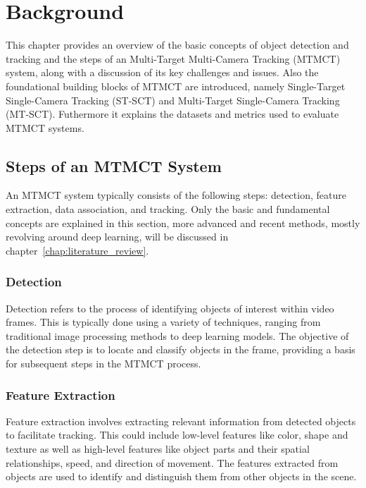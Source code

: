 \chapter{Background}\label{chap:background}
This chapter provides an overview of the basic concepts of object detection and tracking and the steps of an Multi-Target Multi-Camera Tracking (MTMCT) system, along with a discussion of its key challenges and issues. Also the foundational building blocks of MTMCT are introduced, namely Single-Target Single-Camera Tracking (ST-SCT) and Multi-Target Single-Camera Tracking (MT-SCT). Futhermore it explains the datasets and metrics used to evaluate MTMCT systems.

\section{Steps of an MTMCT System}\label{sec:steps_of_an_mtmct_system}
An MTMCT system typically consists of the following steps: detection, feature extraction, data association, and tracking. Only the basic and fundamental concepts are explained in this section, more advanced and recent methods, mostly revolving around deep learning, will be discussed in chapter~\ref{chap:literature_review}.

\subsection{Detection}\label{subsec:detection}
Detection refers to the process of identifying objects of interest within video frames. This is typically done using a variety of techniques, ranging from traditional image processing methods to deep learning models. The objective of the detection step is to locate and classify objects in the frame, providing a basis for subsequent steps in the MTMCT process.

\subsection{Feature Extraction}\label{subsec:feature_extraction}
Feature extraction involves extracting relevant information from detected objects to facilitate tracking. This could include low-level features like color, shape and texture as well as high-level features like object parts and their spatial relationships, speed, and direction of movement. The features extracted from objects are used to identify and distinguish them from other objects in the scene.

